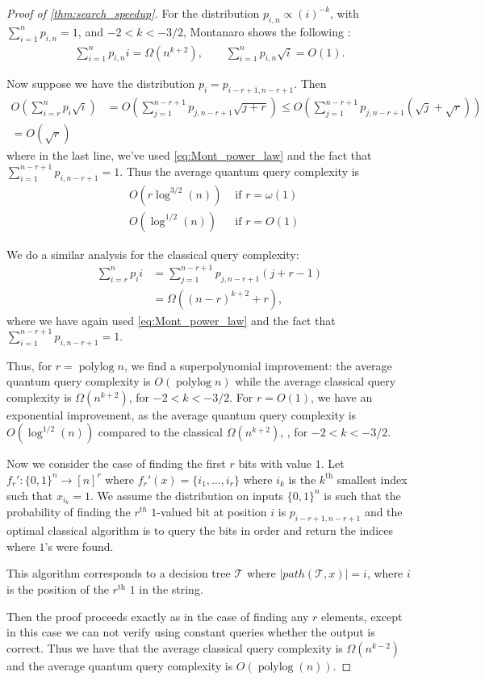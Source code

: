\documentclass[cleveref, autoref, thm-restate,11pt]{article}
\theoremstyle{definition}
\newcommand{\sop}[1]{{\mathcal #1}}
\def\polylog{\operatorname{polylog}}
\begin{document}
\begin{proof}[Proof of \cref{thm:search_speedup}]
For the distribution $p_{i,n} \propto(i)^{-k}$, with $\sum_{i=1}^np_{i,n}=1$, and 
$-2<k< -3/2$,
 Montanaro shows the following \cite[Prop. 2.5]{montanaro2010quantum}:
\begin{align}\label{eq:Mont_power_law}
\sum_{i=1}^{n}p_{i,n}i=\Omega(n^{k+2}),\qquad \sum_{i=1}^{n}p_{i,n}\sqrt{i}=O(1).
\end{align}

Now suppose we have the distribution $p_i=p_{i-r+1,n-r+1}$. Then 
\begin{align}
O\left(\sum_{i={r}}^np_{i}\sqrt{i}\right)
&=
O\left(\sum_{j=1}^{n-r+1}p_{j,n-r+1}\sqrt{j+r}\right)
\leq O\left(\sum_{j=1}^{n-r+1}p_{j,n-r+1}(\sqrt{j}+\sqrt{r})\right)&\nonumber\\
=O(\sqrt{r})
\end{align}
where in the last line, we've used \cref{eq:Mont_power_law} and the fact
that $\sum_{i=1}^{n-r+1} p_{i,n-r+1}= 1.$ Thus the average
quantum query complexity is
\begin{align}
&O\left(r\log^{3/2}(n)\right) &\textrm{ if }r=\omega(1)\\
&O\left(\log^{1/2}(n)\right) &\textrm{ if }r=O(1)
\end{align}

We do a similar analysis for the classical query complexity:
\begin{align}
\sum_{i=r}^{n}p_i i&=\sum_{j=1}^{n-r+1}p_{j,n-r+1}(j+r-1)\nonumber\\
&=\Omega((n-r)^{k+2}+r),
\end{align}
where we have again used \cref{eq:Mont_power_law} and the fact
that $\sum_{i=1}^{n-r+1} p_{i,n-r+1}= 1.$

Thus, for $r=\polylog n$, we find a superpolynomial improvement: the average
quantum query complexity is $O(\polylog n)$ while the average
classical query complexity is $\Omega(n^{k+2})$, for $-2<k< -3/2$. For $r=O(1)$,
we have an exponential improvement, as the average quantum query complexity is
$O\left(\log^{1/2}(n)\right)$ compared to the classical $\Omega(n^{k+2})$,
, for $-2<k< -3/2$.

Now we consider the case of finding the first $r$ bits with value $1$.
Let $f_r':\{0,1\}^n\rightarrow [n]^r$
where $f_r'(x)=\{i_1,\dots,i_r\}$ where $i_k$ is the $k^\textrm{th}$ smallest index such that $x_{i_k}=1$.
We assume the distribution on inputs $\{0,1\}^n$ is such that the probability of finding the $r^{th}$ $1$-valued bit at position $i$ 
is $p_{i-r+1,n-r+1}$ and the optimal classical algorithm is to query the bits in order and return the indices where $1$'s were found. 

This algorithm corresponds to a decision tree
$\sop T$ where $|path(\sop T,x)|=i$, where $i$ is the position of the $r^\textrm{th}$ $1$ in the string. 

Then the proof proceeds exactly as in the case of finding any $r$ elements,
except in this case we can not verify using constant queries whether the
output is correct. Thus we have that the average classical query complexity is $\Omega(n^{k-2})$ 
and the average quantum query complexity is $O\left(\polylog(n)\right).$

\end{proof}
\end{document}
